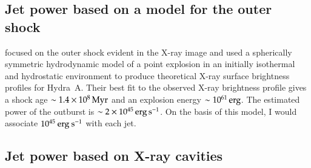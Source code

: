 


%
%
\subsection{Jet power based on a model for the outer shock}\label{s:powsh}

\citet{nulsen05} focused on the outer shock evident in the X-ray image and used a spherically symmetric hydrodynamic model of a point explosion in an initially isothermal and hydrostatic environment to produce theoretical X-ray surface brightness profiles for Hydra~A. Their best fit to the observed X-ray brightness profile gives a shock age $\sim 1.4 \times 10^8 \, \rm Myr$ and an explosion energy $\sim 10^{61} \, \rm erg$. The estimated power of the outburst is $\sim 2 \times 10^{45} \, \rm erg \, s^{-1}$. On the basis of this model, I would associate $10^{45} \> \rm erg \> s^{-1}$ with each jet.

%
%
\subsection{Jet power based on X-ray cavities}\label{s:powx}

